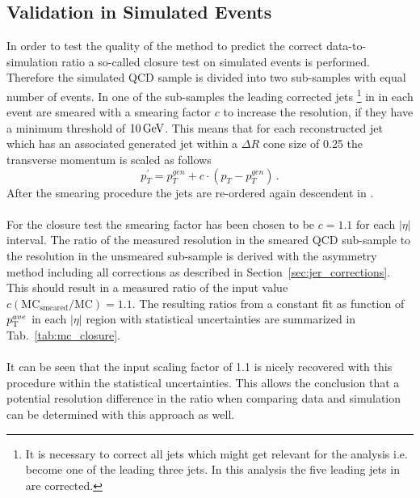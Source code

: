 \subsection{Validation in Simulated Events}
\label{sec:jer_validation_closure}
In order to test the quality of the method to predict the correct data-to-simulation ratio a so-called closure test on simulated events is performed. \\
Therefore the simulated QCD sample is divided into two sub-samples with equal number of events. In one of the sub-samples the leading corrected jets \footnote{It is necessary to correct all jets which might get relevant for the analysis i.e. become one of the leading three jets. In this analysis the five leading jets in \pt are corrected.} in \pt in each event are smeared with a smearing factor $c$ to increase the \pt resolution, if they have a minimum \pt threshold of $10\,\rm{GeV}$. This means that for each reconstructed jet which has an associated generated jet within a $\Delta R$ cone size of 0.25 the transverse momentum is scaled as follows
\begin{equation}
 p^{'}_{T} = p^{gen}_{T} + c \cdot (p_{T} - p^{gen}_{T}) \, .
\end{equation} 
After the smearing procedure the jets are re-ordered again descendent in \pt.\\
\\
For the closure test the smearing factor has been chosen to be $c = 1.1$ for each $|\eta|$ interval. The ratio of the measured resolution in the smeared QCD sub-sample to the resolution in the unsmeared sub-sample is derived with the asymmetry method including all corrections as described in Section~\ref{sec:jer_corrections}. This should result in a measured ratio of the input value $c\mathrm{(MC_{smeared}/MC)} = 1.1$. The resulting ratios from a constant fit as function of $p_{\text{T}}^{ave}$ in each $|\eta|$ region with statistical uncertainties are summarized in Tab.~\ref{tab:mc_closure}.\\
\\
It can be seen that the input scaling factor of 1.1 is nicely recovered with this procedure within the statistical uncertainties. This allows the conclusion that a potential resolution difference in the ratio when comparing data and simulation can be determined with this approach as well.

